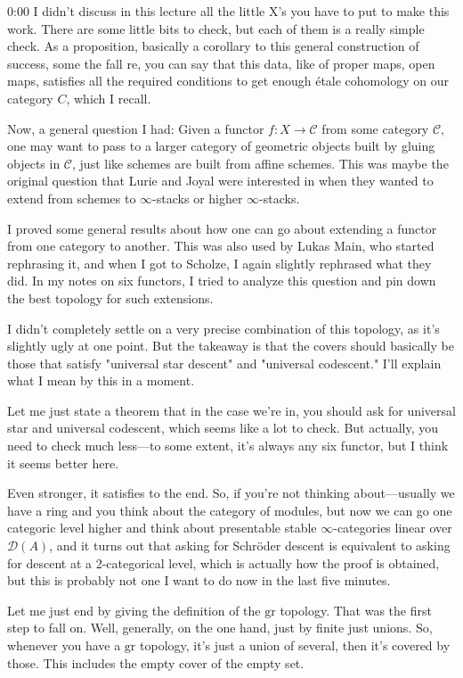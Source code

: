\begin{unfinished}{0:00}
I didn't discuss in this lecture all the little X's you have to put to make this work. There are some little bits to check, but each of them is a really simple check. As a proposition, basically a corollary to this general construction of success, some the fall re, you can say that this data, like of proper maps, open maps, satisfies all the required conditions to get enough étale cohomology on our category $C$, which I recall.

Now, a general question I had: Given a functor $f: X \to \mathcal{C}$ from some category $\mathcal{C}$, one may want to pass to a larger category of geometric objects built by gluing objects in $\mathcal{C}$, just like schemes are built from affine schemes. This was maybe the original question that Lurie and Joyal were interested in when they wanted to extend from schemes to $\infty$-stacks or higher $\infty$-stacks.

I proved some general results about how one can go about extending a functor from one category to another. This was also used by Lukas Main, who started rephrasing it, and when I got to Scholze, I again slightly rephrased what they did. In my notes on six functors, I tried to analyze this question and pin down the best topology for such extensions.

I didn't completely settle on a very precise combination of this topology, as it's slightly ugly at one point. But the takeaway is that the covers should basically be those that satisfy "universal star descent" and "universal codescent." I'll explain what I mean by this in a moment.

Let me just state a theorem that in the case we're in, you should ask for universal star and universal codescent, which seems like a lot to check. But actually, you need to check much less---to some extent, it's always any six functor, but I think it seems better here.


Even stronger, it satisfies to the end. So, if you're not thinking about---usually we have a ring and you think about the category of modules, but now we can go one categoric level higher and think about presentable stable $\infty$-categories linear over $\mathcal{D}(A)$, and it turns out that asking for Schröder descent is equivalent to asking for descent at a 2-categorical level, which is actually how the proof is obtained, but this is probably not one I want to do now in the last five minutes.

Let me just end by giving the definition of the $\mathrm{gr}$ topology. That was the first step to fall on. Well, generally, on the one hand, just by finite just unions. So, whenever you have a $\mathrm{gr}$ topology, it's just a union of several, then it's covered by those. This includes the empty cover of the empty set.


\end{unfinished}
